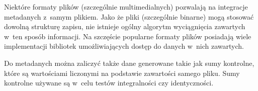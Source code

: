 \par
Niektóre formaty plików (szczególnie multimedialnych) pozwalają na integracje metadanych z~samym plikiem. Jako że pliki (szczególnie binarne) mogą stosować dowolną strukturę zapisu, nie istnieje ogólny algorytm wyciągnięcia zawartych w~ten sposób informacji. Na szczęście popularne formaty plików posiadają wiele implementacji bibliotek umożliwiających dostęp do danych w~nich zawartych.

\par
Do metadanych można zaliczyć także dane generowane takie jak sumy kontrolne, które są wartościami liczonymi na podstawie zawartości samego pliku. Sumy kontrolne używane są w~celu testów integralności czy identyczności.

